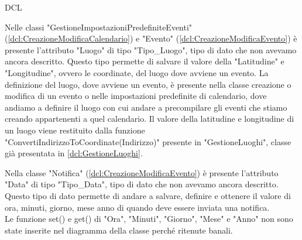 \begin{listaPersonale}{DCL}
    \begin{center}
        
    \end{center}
    \newpage


    Nelle classi "GestioneImpostazioniPredefiniteEventi" (\ref{dcl:CreazioneModificaCalendario}) e "Evento" (\ref{dcl:CreazioneModificaEvento}) è presente l'attributo "Luogo" di tipo "Tipo\_Luogo", tipo di dato che non avevamo ancora descritto. Questo tipo permette di salvare il valore della "Latitudine" e "Longitudine", ovvero le coordinate, del luogo dove avviene un evento. La definizione del luogo, dove avviene un evento, è presente nella classe creazione o modifica di un evento o nelle impostazioni predefinite di calendario, dove andiamo a definire il luogo con cui andare a precompilare gli eventi che stiamo creando appartenenti a quel calendario. Il valore della latitudine e longitudine di un luogo viene restituito dalla funzione "ConvertiIndirizzoToCoordinate(Indirizzo)" presente in "GestioneLuoghi", classe già presentata in \ref{dcl:GestioneLuoghi}.


    \begin{center}
        
    \end{center}




    Nella classe "Notifica" (\ref{dcl:CreazioneModificaEvento}) è presente l'attributo "Data" di tipo "Tipo\_Data", tipo di dato che non avevamo ancora descritto. Questo tipo di dato permette di andare a salvare, definire e ottenere il valore di ora, minuti, giorno, mese anno di quando deve essere inviata una notifica. \\
    Le funzione set() e get() di "Ora", "Minuti", "Giorno", "Mese" e "Anno" non sono state inserite nel diagramma della classe perché ritenute banali.



\end{listaPersonale}
